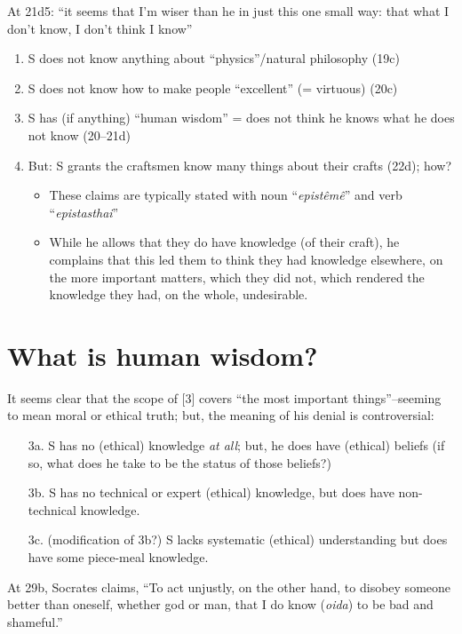 \documentclass[10 pt]{article}
\begin{document}
At 21d5: ``it seems that I’m wiser than he in just this one small way: that what I don’t know, I don’t think I know''
\begin{enumerate}
\item S does not know anything about ``physics''/natural philosophy (19c)
\item S does not know how to make people ``excellent'' (= virtuous) (20c)
\item S has (if anything) ``human wisdom'' = does not think he knows what he does not know (20--21d)
\item  But: S grants the craftsmen know many things about their crafts (22d); how?
\begin{itemize} \item These claims are typically stated with noun ``\emph{epist\^{e}m\^{e}}'' and verb ``\emph{epistasthai}''
\item While he allows that they do have knowledge (of their craft), he complains that this led them to think they had knowledge elsewhere, on the more important matters, which they did not, which rendered the knowledge they had, on the whole, undesirable.
\end{itemize}
\end{enumerate}

\section*{What is human wisdom?}

It seems clear that the scope of [3] covers ``the most important things''--seeming to mean moral or ethical truth; but, the meaning of his denial is controversial:

\begin{enumerate}\item[3a.] S has no (ethical) knowledge \emph{at all}; but, he does have (ethical) beliefs (if so, what does he take to be the status of those beliefs?)

\item[3b.] S has no technical or expert (ethical) knowledge, but does have non-technical knowledge.
\item[3c.] (modification of 3b?) S lacks systematic (ethical) understanding but does have some piece-meal knowledge.
\end{enumerate}
\noindent At 29b, Socrates claims, ``To act unjustly, on the other hand, to disobey someone better than oneself, whether god or man, that I do know (\emph{oida}) to be bad and shameful.''
\end{document}
